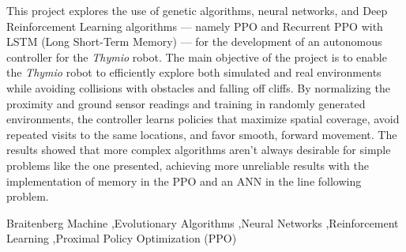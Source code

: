 This project explores the use of genetic algorithms, neural networks, and Deep Reinforcement Learning algorithms — namely PPO and Recurrent PPO with LSTM (Long Short-Term Memory) — for the development of an autonomous controller for the \textit{Thymio} robot. The main objective of the project is to enable the \textit{Thymio} robot to efficiently explore both simulated and real environments while avoiding collisions with obstacles and falling off cliffs. By normalizing the proximity and ground sensor readings and training in randomly generated environments, the controller learns policies that maximize spatial coverage, avoid repeated visits to the same locations, and favor smooth, forward movement.
The results showed that more complex algorithms aren't always desirable for simple problems like the one presented, achieving more unreliable results with the implementation of memory in the PPO and an ANN in the line following problem.


\begin{keyword}
Braitenberg Machine \sep Evolutionary Algorithms \sep Neural Networks \sep Reinforcement Learning \sep Proximal Policy Optimization (PPO)
\end{keyword}
